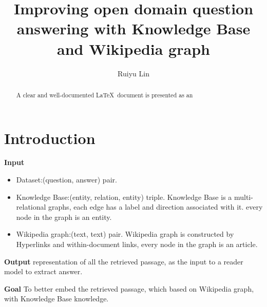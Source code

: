 \documentclass[sigconf]{acmart}
\begin{document}
	
	\title{Improving open domain question answering with Knowledge Base and Wikipedia graph}
	
	\author{Ruiyu Lin}
	
	
	\begin{abstract}
		A clear and well-documented \LaTeX\ document is presented as an
		
	\end{abstract}


	\maketitle
	
	\section{Introduction}
	
	\textbf{Input}
		\begin{itemize}
			\item {Dataset}:(question, answer) pair.
			
			\item{ Knowledge Base}:(entity, relation, entity) triple.
			 Knowledge Base is a multi-relational graphs, each edge has a label and direction associated with it. every node in the graph is an entity.
			 
			 \item{ Wikipedia graph\cite{asai2019learning}}:(text, text) pair.
			 Wikipedia graph is constructed by Hyperlinks and within-document links, every node in the graph is an article.
				
		\end{itemize}
		

	\textbf{Output}
	representation of all the retrieved passage, as the input to a reader model to extract answer.
	
	\textbf{Goal} 
	To better embed the retrieved passage, which based on Wikipedia graph, with  Knowledge Base knowledge.
	
\end{document}
